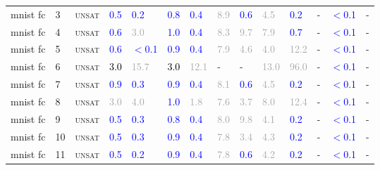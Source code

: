 \begin{center}
{\begin{longtable}{@{}llllllllllllll@{}}
mnist fc & 3 & \textsc{unsat} & \textcolor{blue}{0.5} & \textcolor{blue}{0.2} & \textcolor{blue}{0.8} & \textcolor{blue}{0.4} & \textcolor{darkgray}{8.9} & \textcolor{blue}{0.6} & \textcolor{darkgray}{4.5} & \textcolor{blue}{0.2} & - & \textcolor{blue}{$<$0.1} & - \\
mnist fc & 4 & \textsc{unsat} & \textcolor{blue}{0.6} & \textcolor{darkgray}{3.0} & \textcolor{blue}{1.0} & \textcolor{blue}{0.4} & \textcolor{darkgray}{8.3} & \textcolor{darkgray}{9.7} & \textcolor{darkgray}{7.9} & \textcolor{blue}{0.7} & - & \textcolor{blue}{$<$0.1} & - \\
mnist fc & 5 & \textsc{unsat} & \textcolor{blue}{0.6} & \textcolor{blue}{$<$0.1} & \textcolor{blue}{0.9} & \textcolor{blue}{0.4} & \textcolor{darkgray}{7.9} & \textcolor{darkgray}{4.6} & \textcolor{darkgray}{4.0} & \textcolor{darkgray}{12.2} & - & \textcolor{blue}{$<$0.1} & - \\
mnist fc & 6 & \textsc{unsat} & \textcolor{black}{3.0} & \textcolor{darkgray}{15.7} & \textcolor{black}{3.0} & \textcolor{darkgray}{12.1} & - & - & \textcolor{darkgray}{13.0} & \textcolor{darkgray}{96.0} & - & \textcolor{blue}{$<$0.1} & - \\
mnist fc & 7 & \textsc{unsat} & \textcolor{blue}{0.9} & \textcolor{blue}{0.3} & \textcolor{blue}{0.9} & \textcolor{blue}{0.4} & \textcolor{darkgray}{8.1} & \textcolor{blue}{0.6} & \textcolor{darkgray}{4.5} & \textcolor{blue}{0.2} & - & \textcolor{blue}{$<$0.1} & - \\
mnist fc & 8 & \textsc{unsat} & \textcolor{darkgray}{3.0} & \textcolor{darkgray}{4.0} & \textcolor{blue}{1.0} & \textcolor{darkgray}{1.8} & \textcolor{darkgray}{7.6} & \textcolor{darkgray}{3.7} & \textcolor{darkgray}{8.0} & \textcolor{darkgray}{12.4} & - & \textcolor{blue}{$<$0.1} & - \\
mnist fc & 9 & \textsc{unsat} & \textcolor{blue}{0.5} & \textcolor{blue}{0.3} & \textcolor{blue}{0.8} & \textcolor{blue}{0.4} & \textcolor{darkgray}{8.0} & \textcolor{darkgray}{9.8} & \textcolor{darkgray}{4.1} & \textcolor{blue}{0.2} & - & \textcolor{blue}{$<$0.1} & - \\
mnist fc & 10 & \textsc{unsat} & \textcolor{blue}{0.5} & \textcolor{blue}{0.3} & \textcolor{blue}{0.9} & \textcolor{blue}{0.4} & \textcolor{darkgray}{7.8} & \textcolor{darkgray}{3.4} & \textcolor{darkgray}{4.3} & \textcolor{blue}{0.2} & - & \textcolor{blue}{$<$0.1} & - \\
mnist fc & 11 & \textsc{unsat} & \textcolor{blue}{0.5} & \textcolor{blue}{0.2} & \textcolor{blue}{0.9} & \textcolor{blue}{0.4} & \textcolor{darkgray}{7.8} & \textcolor{blue}{0.6} & \textcolor{darkgray}{4.2} & \textcolor{blue}{0.2} & - & \textcolor{blue}{$<$0.1} & - \\

\end{longtable}}
\end{center}
